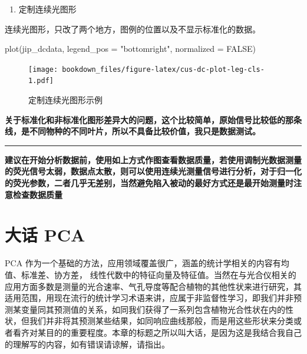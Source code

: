 \documentclass[
]{krantz}
\makeatletter
\newenvironment{Shaded}{\begin{snugshade}}{\end{snugshade}}
\newcommand{\AttributeTok}[1]{\textcolor[rgb]{0.77,0.63,0.00}{#1}}
\newcommand{\ConstantTok}[1]{\textcolor[rgb]{0.00,0.00,0.00}{#1}}
\newcommand{\FunctionTok}[1]{\textcolor[rgb]{0.00,0.00,0.00}{#1}}
\newcommand{\NormalTok}[1]{#1}
\newcommand{\StringTok}[1]{\textcolor[rgb]{0.31,0.60,0.02}{#1}}
\providecommand{\tightlist}{%
  \setlength{\itemsep}{0pt}\setlength{\parskip}{0pt}}
\newenvironment{kframe}{%
\medskip{}
\setlength{\fboxsep}{.8em}
 \def\at@end@of@kframe{}%
 \ifinner\ifhmode%
  \def\at@end@of@kframe{\end{minipage}}%
  \begin{minipage}{\columnwidth}%
 \fi\fi%
 \def\FrameCommand##1{\hskip\@totalleftmargin \hskip-\fboxsep
 \colorbox{shadecolor}{##1}\hskip-\fboxsep
     \hskip-\linewidth \hskip-\@totalleftmargin \hskip\columnwidth}%
 \MakeFramed {\advance\hsize-\width
   \@totalleftmargin\z@ \linewidth\hsize
   \@setminipage}}%
 {\par\unskip\endMakeFramed%
 \at@end@of@kframe}
\renewenvironment{Shaded}{\begin{kframe}}{\end{kframe}}
\makeatother
\begin{document}
\begin{enumerate}
\def\labelenumi{\arabic{enumi}.}
\setcounter{enumi}{1}
\tightlist
\item
  定制连续光图形
\end{enumerate}

连续光图形，只改了两个地方，图例的位置以及不显示标准化的数据。

\begin{Shaded}
\begin{Highlighting}[]
\FunctionTok{plot}\NormalTok{(jip\_dcdata, }\AttributeTok{legend\_pos =} \StringTok{"bottomright"}\NormalTok{, }\AttributeTok{normalized =} \ConstantTok{FALSE}\NormalTok{)}
\end{Highlighting}
\end{Shaded}

\begin{figure}
\centering
\texttt{[image: bookdown\_files/figure-latex/cus-dc-plot-leg-cls-1.pdf]}
\caption{\label{fig:cus-dc-plot-leg-cls}定制连续光图形示例}
\end{figure}

\textbf{关于标准化和非标准化图形差异大的问题，这个比较简单，原始信号比较低的那条线，是不同物种的不同叶片，所以不具备比较价值，我只是数据测试。}

\begin{center}\rule{0.5\linewidth}{0.5pt}\end{center}

\textbf{建议在开始分析数据前，使用如上方式作图查看数据质量，若使用调制光数据测量的荧光信号太弱，数据点太散，则可以使用连续光测量信号进行分析，对于归一化的荧光参数，二者几乎无差别，当然避免陷入被动的最好方式还是最开始测量时注意检查数据质量}

\cleardoublepage

\hypertarget{pca-anylysis}{%
\chapter{大话 PCA}\label{pca-anylysis}}

PCA 作为一个基础的方法，应用领域覆盖很广，涵盖的统计学相关的内容有均值、标准差、协方差， 线性代数中的特征向量及特征值。当然在与光合仪相关的应用方面多数是测量的光合速率、气孔导度等配合植物的其他性状来进行研究，其适用范围，用现在流行的统计学习术语来讲，应属于非监督性学习，即我们并非预测某变量同其预测值的关系，如同我们获得了一系列包含植物光合性状在内的性状，但我们并非将其预测某些结果，如同响应曲线那般，而是用这些形状来分类或者看齐对某目的的重要程度。本章的标题之所以叫大话，是因为这是我结合我自己的理解写的内容，如有错误请谅解，请指出。
\end{document}
